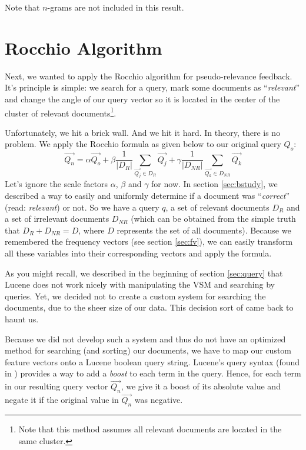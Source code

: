 \documentclass[11pt]{article}
\begin{document}
Note that $n$-grams are not included in this result.

\section{Rocchio Algorithm}\label{sec:rocchio}
Next, we wanted to apply the \textsf{Rocchio} algorithm for pseudo-relevance feedback. It's principle is simple: we search for a query, mark some documents as ``\textit{relevant}'' and change the angle of our query vector so it is located in the center of the cluster of relevant documents\footnote{Note that this method assumes all relevant documents are located in the same cluster.}.

Unfortunately, we hit a brick wall. And we hit it hard. In theory, there is no problem. We apply the Rocchio formula as given below to our original query $Q_o$:
$$\overrightarrow{Q_n} = \alpha \overrightarrow{Q_o} + \beta \frac{1}{|D_R|} \sum_{\overrightarrow{Q_j} \in D_R}{\overrightarrow{Q_j}} + \gamma \frac{1}{|D_{NR}|} \sum_{\overrightarrow{Q_k} \in D_{NR}}{\overrightarrow{Q_k}}$$
Let's ignore the scale factors $\alpha$, $\beta$ and $\gamma$ for now. In section \ref{sec:bstudy}, we described a way to easily and uniformly determine if a document was ``\textit{correct}'' (read: \textit{relevant}) or not. So we have a query $q$, a set of relevant documents $D_R$ and a set of irrelevant documents $D_{NR}$ (which can be obtained from the simple truth that $D_R + D_{NR} = D$, where $D$ represents the set of all documents). Because we remembered the frequency vectors (see section \ref{sec:fv}), we can easily transform all these variables into their corresponding vectors and apply the formula.

As you might recall, we described in the beginning of section \ref{sec:query} that Lucene does not work nicely with manipulating the VSM and searching by queries. Yet, we decided not to create a custom system for searching the documents, due to the sheer size of our data. This decision sort of came back to haunt us.

Because we did not develop such a system and thus do not have an optimized method for searching (and sorting) our documents, we have to map our custom feature vectors onto a Lucene boolean query string. Lucene's query syntax (found in \cite{lucene}) provides a way to add a \textit{boost} to each term in the query. Hence, for each term in our resulting query vector $\overrightarrow{Q_n}$, we give it a boost of its absolute value and negate it if the original value in $\overrightarrow{Q_n}$ was negative.
\end{document}
